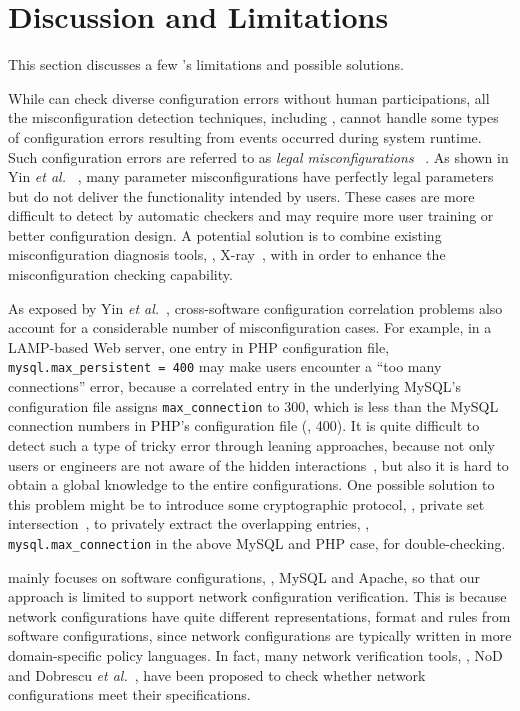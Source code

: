 
\section{Discussion and Limitations}

This section discusses a few \app's limitations
and possible solutions.

While \app can check diverse configuration errors without
human participations, all the misconfiguration detection techniques,
including \app, cannot handle some types of configuration errors
resulting from events occurred during system runtime.
Such configuration errors are referred to as {\em legal misconfigurations}%
~\cite{yin11anempirical}. As shown in Yin {\em et al.}%
~\cite{yin11anempirical}, many parameter misconfigurations have 
perfectly legal parameters but do not deliver the functionality intended
by users. These cases are more difficult to detect by
automatic checkers and may require more user training or
better configuration design.
A potential solution is to combine existing misconfiguration diagnosis
tools, \eg, X-ray~\cite{attariyan12x-ray}, 
with \app in order to enhance the 
misconfiguration checking capability.

As exposed by Yin {\em et al.}~\cite{yin11anempirical},
cross-software configuration correlation problems also account
for a considerable number of misconfiguration cases.
For example, in a LAMP-based Web server, one entry in 
PHP configuration file, {\tt mysql.max\_persistent = 400}
may make users encounter a ``too many connections'' error,
because a correlated entry in the underlying MySQL's configuration
file assigns {\tt max\_connection} to 300, which is less
than the MySQL connection numbers in PHP's configuration file (\ie, 400).
It is quite difficult to detect such a type of tricky error
through leaning approaches, because not only users or engineers 
are not aware of the hidden interactions~\cite{xu15systems},
but also it is hard to obtain a global knowledge to the entire
configurations.
One possible solution to this problem might be to introduce
some cryptographic protocol, \eg, private set
intersection~\cite{kissner05privacy}, to privately extract the
overlapping entries, \eg, {\tt mysql.max\_connection} in the 
above MySQL and PHP case, for double-checking.

\app mainly focuses on software configurations, \eg, MySQL and Apache,
so that our approach is limited to support network configuration
verification. This is because network configurations have quite
different representations, format and rules from software configurations,
since network configurations are typically written in 
more domain-specific policy languages.
In fact, many network verification tools, 
\eg, NoD~\cite{lopes15checking} and 
Dobrescu {\em et al.}~\cite{dobrescu14software},
have been proposed to check whether network configurations
meet their specifications.

